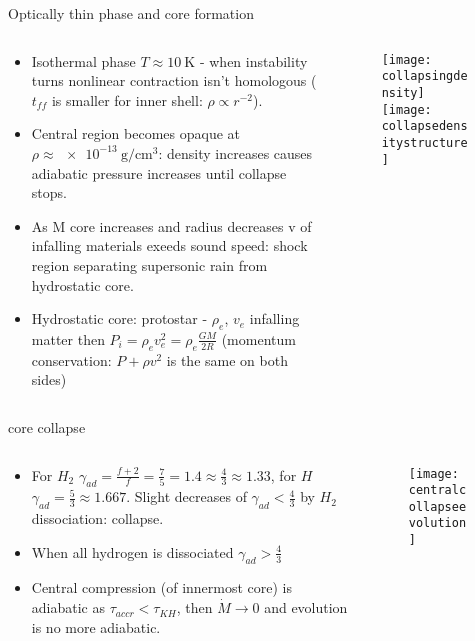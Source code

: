 \begin{frame}{Optically thin phase and core formation}
\begin{columns}[T]
\begin{column}{0.55\textwidth}
\begin{itemize}
	\item Isothermal phase $T\approx\SI{10}{\kelvin}$ - when instability turns nonlinear contraction isn't homologous ($t_{ff}$ is smaller for inner shell: $\rho\propto r^{-2}$).
	\item Central region becomes opaque at $\rho\approx\SI{e-13}{\gram\per\cubic\cm}$: density increases causes adiabatic pressure increases until collapse stops.
	\item As M core increases and radius decreases v of infalling materials exeeds sound speed: shock region separating supersonic rain from hydrostatic core.
	\item Hydrostatic core: protostar - $\rho_e$, $v_e$ infalling matter then $P_i=\rho_ev_e^2=\rho_e\frac{GM}{2R}$ (momentum conservation: $P+\rho v^2$ is the same on both sides) 
\end{itemize}
\end{column}
\begin{column}{0.45\textwidth}
\begin{figure}[!ht]
\texttt{[image: collapsingdensity]}\label{fig:collapsingdensity}
\texttt{[image: collapsedensitystructure]}\label{fig:collapsedensitystructure}
\end{figure}
\end{column}
\end{columns}
\end{frame}

\begin{frame}{core collapse}
\begin{columns}[T]
	\begin{column}{0.55\textwidth}
	\begin{itemize}
	\item For $H_2$ $\gamma_{ad}=\frac{f+2}{f}=\frac{7}{5}=1.4\approx\frac{4}{3}\approx1.33$, for $H$ $\gamma_{ad}=\frac{5}{3}\approx1.667$.  Slight decreases of $\gamma_{ad}<\frac{4}{3}$ by $H_2$ dissociation: collapse.
	\item When all hydrogen is dissociated $\gamma_{ad}>\frac{4}{3}$
	\item Central compression (of innermost core) is adiabatic as $\tau_{accr}<\tau_{KH}$, then $\dot{M}\to0$ and evolution is no more adiabatic.
	\end{itemize}
	\end{column}
	\begin{column}{0.45\textwidth}
	\begin{figure}[!ht]
	\texttt{[image: centralcollapseevolution]}\label{fig:centralcollapseevolution}
	\end{figure}
	\end{column}
\end{columns}
\end{frame}

